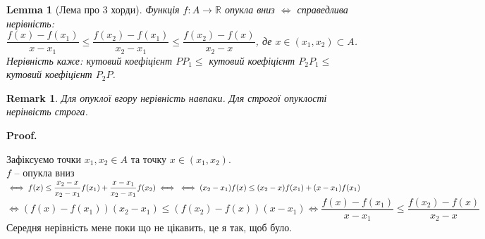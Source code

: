 \documentclass[a4paper, 14pt]{article}
\makeatletter
\def\qed{$\blacksquare$}
\theoremstyle{theoremdd}
\theoremstyle{theoremdd}
\theoremstyle{theoremdd}
\theoremstyle{theoremdd}
\theoremstyle{theoremdd}
\theoremstyle{theoremdd}
\newtheorem{remark}[theorem]{Remark}
\theoremstyle{theoremdd}
\newtheorem{lemma}[theorem]{Lemma}
\theoremstyle{theoremdd}
\renewenvironment{proof}[1][Proof.\\]{\par
\pushQED{\hfill \qed}%
\normalfont \topsep6\p@\@plus6\p@\relax
\trivlist
\item\relax
{\bfseries
#1\@addpunct{.}}\hspace\labelsep\ignorespaces
}{%
\popQED\endtrivlist\@endpefalse
}
\makeatother
\begin{document}
\begin{lemma}[Лема про 3 хорди]
Функція $f \colon A \to \mathbb{R}$ опукла вниз $\iff$ справедлива нерівність:\\
$\dfrac{f(x)-f(x_1)}{x-x_1} \leq \dfrac{f(x_2)-f(x_1)}{x_2-x_1} \leq \dfrac{f(x_2)-f(x)}{x_2-x}$, де $x \in (x_1,x_2) \subset A$.
\\ %
Нерівність каже: кутовий коефіцієнт $PP_1 \leq$ кутовий коефіцієнт $P_2P_1 \leq$ кутовий коефіцієнт $P_2P$.
\end{lemma}

\begin{remark}
Для опуклої вгору нерівність навпаки. Для строгої опуклості нерінвість строга.
\end{remark}

\begin{proof}
Зафіксуємо точки $x_1,x_2 \in A$ та точку $x \in (x_1,x_2)$.\\
$f$ -- опукла вниз $\iff f(x) \leq \dfrac{x_2-x}{x_2-x_1}f(x_1) + \dfrac{x-x_1}{x_2-x_1}f(x_2)
\iff \\ \iff (x_2-x_1) f(x) \leq (x_2-x)f(x_1) + (x-x_1)f(x_1)$\\
$\iff (f(x)-f(x_1))(x_2-x_1) \leq (f(x_2)-f(x))(x-x_1)
\iff \dfrac{f(x)-f(x_1)}{x-x_1} \leq \dfrac{f(x_2)-f(x)}{x_2-x}$ \\
Середня нерівність мене поки що не цікавить, це я так, щоб було.
\end{proof}
\end{document}
